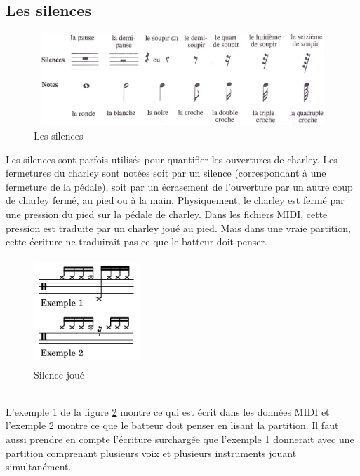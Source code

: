 \subsection*{Les silences}
\begin{figure}[h]
	\centering
	\includegraphics[height=35mm, width=120mm]{z_images/3_methodes/0_notation_de_la_batterie/4_silences.png}
	\caption{Les silences}
	\label{silences}
\end{figure}\newpage
Les silences sont parfois utilisés pour quantifier les ouvertures de charley. Les fermetures du charley sont notées soit par un silence (correspondant à une fermeture de la pédale), soit par un écrasement de l’ouverture par un autre coup de charley fermé, au pied ou à la main.
Physiquement, le charley est fermé par une pression du pied sur la pédale de charley. Dans les fichiers MIDI, cette pression est traduite par un charley joué au pied. Mais dans une vraie partition, cette écriture ne traduirait pas ce que le batteur doit penser.
\begin{figure}[h]
	\centering
	\includegraphics[height=40mm, width=40mm]{z_images/3_methodes/0_notation_de_la_batterie/5_silence_joue.png}
	\caption{Silence joué}
	\label{silence joue}
\end{figure}\\
L’exemple 1 de la figure \ref{silence joue} montre ce qui est écrit dans les données MIDI et l’exemple 2 montre ce que le batteur doit penser en lisant la partition. Il faut aussi prendre en compte l’écriture surchargée que l’exemple 1 donnerait avec une partition comprenant plusieurs voix et plusieurs instruments jouant simultanément.
